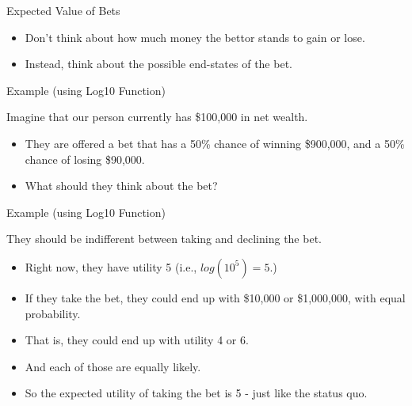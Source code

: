 \documentclass[
  ignorenonframetext,
]{beamer}
\providecommand{\tightlist}{%
  \setlength{\itemsep}{0pt}\setlength{\parskip}{0pt}}
\renewcommand{\,}{\text{, }}
\begin{document}
\begin{frame}{Expected Value of Bets}
\protect\hypertarget{expected-value-of-bets}{}

\begin{itemize}
\tightlist
\item
  Don't think about how much money the bettor stands to gain or lose.
\item
  Instead, think about the possible end-states of the bet.
\end{itemize}

\end{frame}

\begin{frame}{Example (using Log10 Function)}
\protect\hypertarget{example-using-log10-function}{}

Imagine that our person currently has \$100,000 in net wealth. \pause

\begin{itemize}
\tightlist
\item
  They are offered a bet that has a 50\% chance of winning \$900,000,
  and a 50\% chance of losing \$90,000.
\item
  What should they think about the bet?
\end{itemize}

\end{frame}

\begin{frame}{Example (using Log10 Function)}
\protect\hypertarget{example-using-log10-function-1}{}

They should be indifferent between taking and declining the bet.

\begin{itemize}
\tightlist
\item
  Right now, they have utility 5 (i.e., \(log(10^5) = 5\).) \pause
\item
  If they take the bet, they could end up with \$10,000 or \$1,000,000,
  with equal probability.
\item
  That is, they could end up with utility 4 or 6.
\item
  And each of those are equally likely.
\item
  So the expected utility of taking the bet is 5 - just like the status
  quo.
\end{itemize}

\end{frame}
\end{document}
